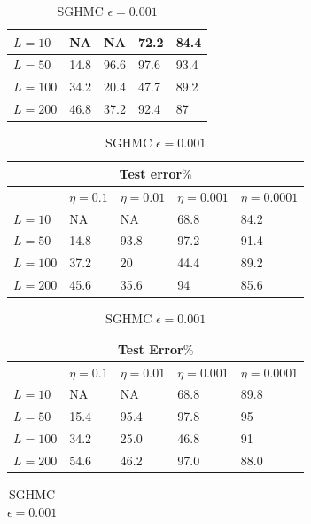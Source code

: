 \documentclass[12pt]{report}
\begin{document}
\begin{table}[]
\begin{minipage}{0.5\linewidth}
\begin{tabular}{@{}lllll@{}}
$L=10$  & NA       & NA     & 72.2      & 84.4    \\ \midrule
$L=50 $ & 14.8       & 96.6     & 97.6      & 93.4    \\ \midrule
$L=100$  & 34.2      & 20.4    & 47.7     &  89.2  \\ \midrule
$L =200 $ & 46.8      & 37.2   & 92.4      & 87   \\ \bottomrule
\end{tabular}
\caption{SGHMC $\epsilon = 0.1$}
\end{minipage}
\begin{minipage}{0.5\linewidth}
\centering
\footnotesize
\begin{tabular}{@{}lllll@{}}
\toprule
\multicolumn{5}{c}{Test error$\%$}                  \\ \midrule
     & $\eta = 0.1$ & $\eta = 0.01$ & $\eta = 0.001$ & $\eta =0.0001$ \\ \midrule
$L=10$  & NA       & NA     & 68.8     & 84.2    \\ \midrule
$L=50$  & 14.8      & 93.8    & 97.2     & 91.4  \\ \midrule
$L =100$ & 37.2      & 20   & 44.4      & 89.2   \\ \midrule
$L=200 $ & 45.6      & 35.6     & 94      & 85.6   \\ \bottomrule
\end{tabular}
\caption{SGHMC $\epsilon = 0.01$}
\end{minipage}
\begin{minipage}{0.5\linewidth}
\centering
\footnotesize
\begin{tabular}{@{}lllll@{}}
\toprule
\multicolumn{5}{c}{Test Error$\%$}                  \\ \midrule
     & $\eta = 0.1$ & $\eta = 0.01 $& $\eta = 0.001$ & $\eta =0.0001$ \\ \midrule
$L=10$  & NA       & NA     & 68.8      & 89.8    \\ \midrule
$L=50$  & 15.4      & 95.4    & 97.8     & 95  \\ \midrule
$L =100$ & 34.2      & 25.0   & 46.8      & 91   \\ \midrule
$L=200 $ & 54.6      & 46.2     & 97.0      & 88.0   \\ \bottomrule
\end{tabular}
\caption{SGHMC $\epsilon = 0.001$}
\end{minipage}
\begin{minipage}{0.5\linewidth}
\centering
\footnotesize
\begin{tabular}{@{}lllll@{}}

\end{tabular}
\end{minipage}
\end{table}
\end{document}

